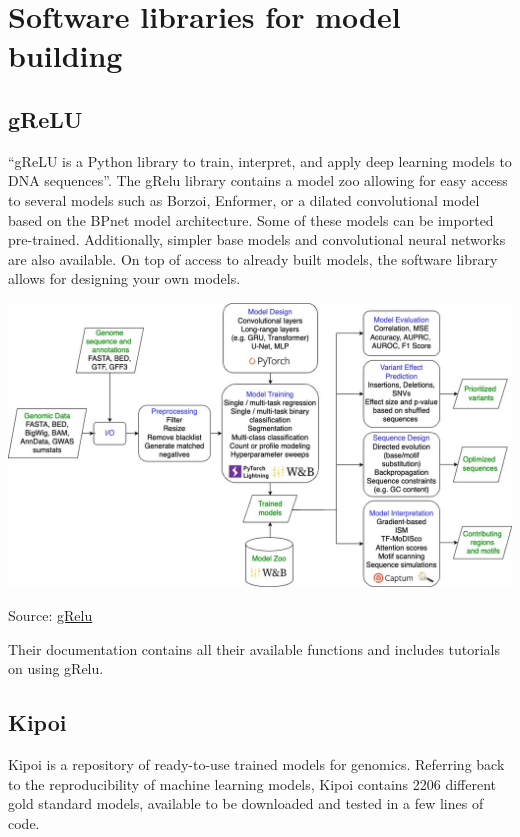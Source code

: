 \documentclass[
]{book}
\begin{document}
\chapter{Software libraries for model building}\label{software-libraries-for-model-building}

\section{gReLU}\label{grelu}

``gReLU is a Python library to train, interpret, and apply deep learning models to DNA sequences''. The gRelu library contains a model zoo allowing for easy access to several models such as Borzoi, Enformer, or a dilated convolutional model based on the BPnet model architecture. Some of these models can be imported pre-trained. Additionally, simpler base models and convolutional neural networks are also available. On top of access to already built models, the software library allows for designing your own models.

\includegraphics{images/grelu.png}

Source: \href{https://github.com/Genentech/gReLU/blob/main/README.md}{gRelu}

Their documentation contains all their available functions and includes tutorials on using gRelu.

\section{Kipoi}\label{kipoi}

Kipoi is a repository of ready-to-use trained models for genomics. Referring back to the reproducibility of machine learning models, Kipoi contains 2206 different gold standard models, available to be downloaded and tested in a few lines of code.
\end{document}
